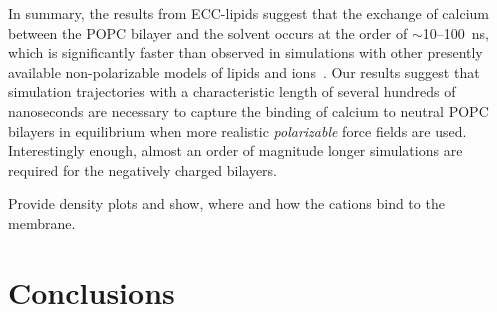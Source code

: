 \documentclass[journal=jpcbfk,manuscript=article]{achemso}
\begin{document}
In summary, the results from ECC-lipids suggest 
that the exchange of calcium between the POPC bilayer and the solvent 
occurs at the order of $\sim$10--100~ns, 
which is significantly faster than observed in simulations 
with other presently available non-polarizable models of lipids and ions~\citep{javanainen17, catte16}. 
Our results suggest 
that simulation trajectories with a characteristic length of several hundreds of nanoseconds 
are necessary to capture the binding of calcium to neutral POPC bilayers 
in equilibrium when more realistic \emph{polarizable} force fields are used. 
Interestingly enough, almost an order of magnitude longer simulations
are required for the negatively charged bilayers. 

 


Provide density plots and show, where and how the cations bind to the membrane. 



 
 



 
 
 
 
 
\section{Conclusions} 
\end{document}
